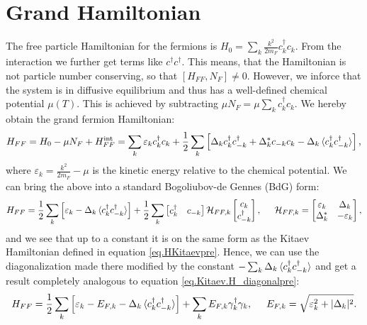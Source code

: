 \section{Grand Hamiltonian} \label{sec.HFFfull}
The free particle Hamiltonian for the fermions is $H_0 = \sum_k \frac{k^2}{2m_F} c^\dagger_k c_k$. From the interaction we further get terms like $c^\dagger c^\dagger$. This means, that the Hamiltonian is not particle number conserving, so that $[H_{FF}, N_F] \neq 0$. However, we inforce that the system is in diffusive equilibrium and thus has a well-defined chemical potential $\mu(T)$. This is achieved by subtracting $\mu N_F = \mu \sum_k c^\dagger_k c_k$. We hereby obtain the grand fermion Hamiltonian:
\begin{equation}
H_{FF} = H_0-\mu N_F + H^\text{int}_{FF} = \sum_k \varepsilon_k c^\dagger_k c_k + \frac{1}{2}\sum_{k} \left[ \Delta_k c^\dagger_k c^\dagger_{-k} + \Delta^*_k c_{-k} c_k  - \Delta_k \braket {c^\dagger_{k}c^\dagger_{-k}} \right], 
\label{eq.HFFdef}
\end{equation} 
where $\varepsilon_k = \frac{k^2}{2m_F} - \mu$ is the kinetic energy relative to the chemical potential. We can bring the above into a standard Bogoliubov-de Gennes (BdG) form:
\begin{equation}
H_{FF} = \frac{1}{2}\sum_k \left[\varepsilon_k - \Delta_k \braket {c^\dagger_k c^\dagger_{-k}}\right] + \frac{1}{2}\sum_{k} \begin{bmatrix} c_k^\dagger & c_{-k} \end{bmatrix} \mathcal{H}_{FF,k} \begin{bmatrix} c_k \\ c^\dagger_{-k} \end{bmatrix}, \hspace{0.5cm} \mathcal{H}_{FF,k} = \begin{bmatrix} \varepsilon_k & \Delta_k \\ \Delta^*_k & -\varepsilon_k \end{bmatrix}, 
\end{equation}
and we see that up to a constant it is on the same form as the Kitaev Hamiltonian defined in equation \eqref{eq.HKitaevpre}. Hence, we can use the diagonalization made there modified by the constant $-\sum_k \Delta_k\braket {c^\dagger_k c^\dagger_{-k}} $ and get a result completely analogous to equation \eqref{eq.Kitaev.H_diagonalpre}: 
\begin{equation}
H_{FF} = \frac{1}{2}\sum_k \left[\varepsilon_k-E_{F,k}-\Delta_k\braket {c^\dagger_k c^\dagger_{-k}}\right] + \sum_k E_{F,k} \gamma^\dagger_k \gamma_k, \hspace{0.5cm} E_{F,k} = \sqrt{\varepsilon_k^2 + |\Delta_k|^2}.
\label{eq.Kitaev.HFF_diagonal}
\end{equation}
